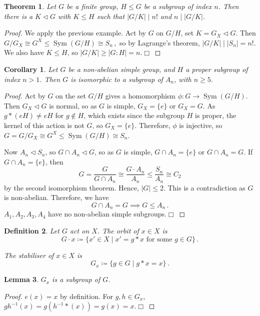 \documentclass{article}
\theoremstyle{plain}\theoremheaderfont{\normalfont\itshape}\theorembodyfont{\rmfamily}\theoremseparator{.}\newtheorem*{rem}{Remark}\newtheorem*{ex}{Example}\newtheorem*{proof}{Proof}\newtheorem*{altp}{Alternative proof}\newtheorem*{nonex}{Non-Example}
\theoremstyle{plain}\theoremheaderfont{\normalfont\bfseries}\theorembodyfont{\rmfamily}\theoremseparator{.}\newtheorem{thm}{Theorem}[section]\newtheorem{lem}[thm]{Lemma}\newtheorem{prop}[thm]{Proposition}\newtheorem*{cor}{Corollary}\newtheorem{defn}[thm]{Definition}\newtheorem{clm}[thm]{Claim}\newtheorem{clminproof}{Claim}\newtheorem*{notn}{Notation}\newtheorem*{exer}{Exercise}\newtheorem*{lemnn}{Lemma}
\theoremstyle{break}\theoremheaderfont{\normalfont\itshape}\theorembodyfont{\rmfamily}\theoremseparator{.\medskip}\newtheorem*{proofskip}{Proof}\newtheorem*{exs}{Examples}\newtheorem*{rems}{Remarks}\newtheorem*{obs}{Observations}
\theoremstyle{break}\theoremheaderfont{\normalfont\bfseries}\theorembodyfont{\rmfamily}\theoremseparator{.\medskip}\newtheorem{lemskip}[thm]{Lemma}\newtheorem{defnskip}[thm]{Definition}\newtheorem{propskip}[thm]{Proposition}\newtheorem{thmskip}[thm]{Theorem}
\numberwithin{equation}{section}
\newcommand{\qed}{\hfill\ensuremath{\Box}}
\newcommand{\abs}[1]{\left|#1\right|}
\DeclareMathOperator*{\Sym}{Sym}
\begin{document}
    \begin{thm}
        Let \(G\) be a finite group, \(H\le G\) be a subgroup of index \(n\). Then there is a \(K\lhd G\) with \(K\le H\) such that \(\abs{G/K}\mid n!\) and \(n\mid\abs{G/K}\).
    \end{thm}
    \begin{proof}
        We apply the previous example. Act by \(G\) on \(G/H\), set \(K=G_X\lhd G\). Then \(G/G_X\cong G^X\le\Sym(G/H)\cong S_n\,,\)
        so by Lagrange's theorem, \(\abs{G/K}\mid\abs{S_n}=n!\). We also have \(K\le H\), so \(\abs{G/K}\ge\abs{G:H}=n\).\qed
    \end{proof}
    \begin{cor}
        Let \(G\) be a non-abelian simple group, and \(H\) a proper subgroup of index \(n>1\). Then \(G\) is isomorphic to a subgroup of \(A_n\), with \(n\ge 5\).
    \end{cor}
    \begin{proof}
        Act by \(G\) on the set \(G/H\) gives a homomorphism \(\phi:G\to\Sym(G/H)\). Then \(G_X\lhd G\) is normal, so as \(G\) is simple, \(G_X=\{e\}\) or \(G_X=G\). As \(g*(eH)\ne eH\) for \(g\notin H\), which exists since the subgroup \(H\) is proper, the kernel of this action is not \(G\), so \(G_X=\{e\}\). Therefore, \(\phi\) is injective, so \(G=G/G_X\cong G^X\le\Sym(G/H)\cong S_n\).
        
        Now \(A_n\lhd S_n\), so \(G\cap A_n\lhd G\), so as \(G\) is simple, \(G\cap A_n=\{e\}\) or \(G\cap A_n=G\). If \(G\cap A_n=\{e\}\), then
        \[G=\frac{G}{G\cap A_n}\cong\frac{G\cdot A_n}{A_n}\le\frac{S_n}{A_n}\cong C_2\]
        by the second isomorphism theorem. Hence, \(\abs{G}\le 2\). This is a contradiction as \(G\) is non-abelian. Therefore, we have
        \[G\cap A_n=G\implies G\le A_n\,.\]
        \(A_1,A_2,A_3,A_4\) have no non-abelian simple subgroups.\qed
    \end{proof}
    \begin{defn}
        Let \(G\) act on \(X\). The \textit{orbit} of \(x\in X\) is
        \[G\cdot x\coloneqq\{x'\in X\mid x'=g*x\text{ for some }g\in G\}\,.\]

        The \textit{stabiliser} of \(x\in X\) is
        \[G_x\coloneqq\{g\in G\mid g*x=x\}\,.\]
    \end{defn}
    \begin{lem}
        \(G_x\) is a subgroup of \(G\).
    \end{lem}
    \begin{proof}
        \(e(x)=x\) by definition. For \(g,h\in G_x\), \(gh^{-1}(x)=g(h^{-1}*(x))=g(x)=x\).\qed
    \end{proof}
\end{document}

